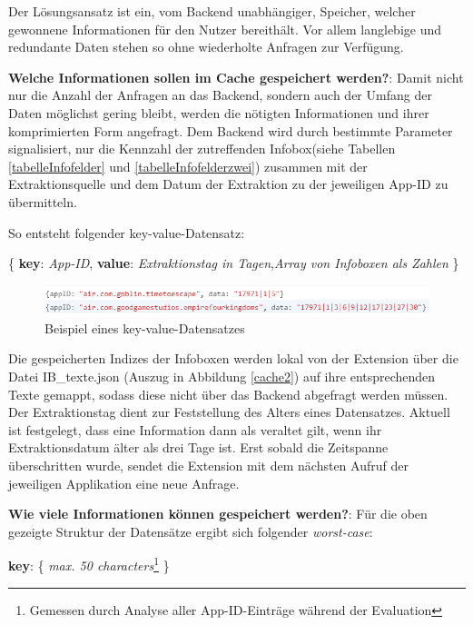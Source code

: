 Der Lösungsansatz ist ein, vom Backend unabhängiger, Speicher, welcher gewonnene Informationen für den Nutzer bereithält. Vor allem langlebige und redundante Daten stehen so ohne wiederholte Anfragen zur Verfügung.


\textbf{Welche Informationen sollen im Cache gespeichert werden?}:
Damit nicht nur die Anzahl der Anfragen an das Backend, sondern auch der Umfang der Daten möglichst gering bleibt, werden die nötigten Informationen und ihrer komprimierten Form angefragt. Dem Backend wird durch bestimmte Parameter signalisiert, nur die Kennzahl der zutreffenden Infobox(siehe Tabellen \ref{tabelleInfofelder} und  \ref{tabelleInfofelderzwei}) zusammen mit der Extraktionsquelle und dem Datum der Extraktion zu der jeweiligen App-ID zu übermitteln.

So entsteht folgender key-value-Datensatz:

\big\{ \textbf{key}: \textit{App-ID}, \textbf{value}: \textit{Extraktionstag in Tagen},\textit{Array von Infoboxen als Zahlen} \big\}

\begin{figure}[ht]
	\centering
	\includegraphics[width=1\textwidth]{pics/cache1.png}
	\caption{Beispiel eines key-value-Datensatzes}
	\label{cache1}
\end{figure}


Die gespeicherten Indizes der Infoboxen werden lokal von der Extension über die Datei \glqq IB\_texte.json \grqq{}(Auszug in Abbildung \ref{cache2}) auf ihre entsprechenden Texte gemappt, sodass diese nicht über das Backend abgefragt werden müssen. Der Extraktionstag dient zur Feststellung des Alters eines Datensatzes. Aktuell ist festgelegt, dass eine Information dann als veraltet gilt, wenn ihr Extraktionsdatum älter als drei Tage ist. Erst sobald die Zeitspanne überschritten wurde, sendet die Extension mit dem nächsten Aufruf der jeweiligen Applikation eine neue Anfrage.




\textbf{Wie viele Informationen können gespeichert werden?}:
Für die oben gezeigte Struktur der Datensätze ergibt sich folgender \textit{worst-case}:

\textbf{key}: \big\{ \textit{max. 50 characters}\footnote{Gemessen durch Analyse aller App-ID-Einträge während der Evaluation} \big\}

